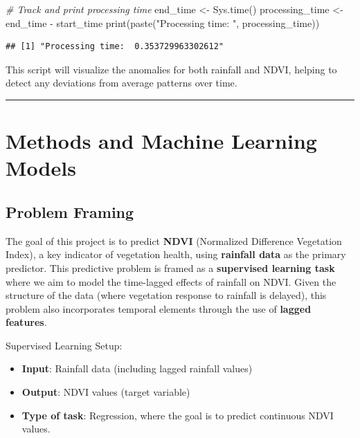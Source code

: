 \documentclass[
]{article}
\newenvironment{Shaded}{}{}
\newcommand{\CommentTok}[1]{\textcolor[rgb]{0.38,0.63,0.69}{\textit{#1}}}
\newcommand{\FunctionTok}[1]{\textcolor[rgb]{0.02,0.16,0.49}{#1}}
\newcommand{\NormalTok}[1]{#1}
\newcommand{\OtherTok}[1]{\textcolor[rgb]{0.00,0.44,0.13}{#1}}
\newcommand{\SpecialCharTok}[1]{\textcolor[rgb]{0.25,0.44,0.63}{#1}}
\newcommand{\StringTok}[1]{\textcolor[rgb]{0.25,0.44,0.63}{#1}}
\providecommand{\tightlist}{%
  \setlength{\itemsep}{0pt}\setlength{\parskip}{0pt}}
\begin{document}
\begin{Shaded}
\begin{Highlighting}[]
\CommentTok{\# Track and print processing time}
\NormalTok{end\_time }\OtherTok{\textless{}{-}} \FunctionTok{Sys.time}\NormalTok{()}
\NormalTok{processing\_time }\OtherTok{\textless{}{-}}\NormalTok{ end\_time }\SpecialCharTok{{-}}\NormalTok{ start\_time}
\FunctionTok{print}\NormalTok{(}\FunctionTok{paste}\NormalTok{(}\StringTok{"Processing time: "}\NormalTok{, processing\_time))}
\end{Highlighting}
\end{Shaded}

\begin{verbatim}
## [1] "Processing time:  0.353729963302612"
\end{verbatim}

This script will visualize the anomalies for both rainfall and NDVI,
helping to detect any deviations from average patterns over time.

\begin{center}\rule{0.5\linewidth}{0.5pt}\end{center}

\section{Methods and Machine Learning
Models}\label{methods-and-machine-learning-models}

\subsection{Problem Framing}\label{problem-framing}

The goal of this project is to predict \textbf{NDVI} (Normalized
Difference Vegetation Index), a key indicator of vegetation health,
using \textbf{rainfall data} as the primary predictor. This predictive
problem is framed as a \textbf{supervised learning task} where we aim to
model the time-lagged effects of rainfall on NDVI. Given the structure
of the data (where vegetation response to rainfall is delayed), this
problem also incorporates temporal elements through the use of
\textbf{lagged features}.

Supervised Learning Setup:

\begin{itemize}
\tightlist
\item
  \textbf{Input}: Rainfall data (including lagged rainfall values)
\item
  \textbf{Output}: NDVI values (target variable)
\item
  \textbf{Type of task}: Regression, where the goal is to predict
  continuous NDVI values.
\end{itemize}
\end{document}
